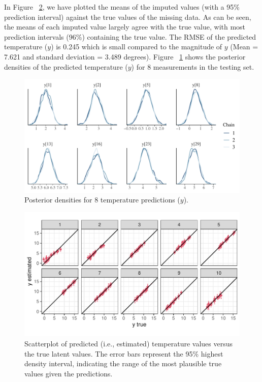 In Figure ~\ref{figure:4y_true_vs_pred}, we have plotted the means of the imputed values (with a 95\% prediction interval) against the true values of the missing data.  As can be seen, the means of each imputed value largely agree with the true value, with most prediction intervals (96\%) containing the true value.
The RMSE of the predicted temperature ($y$) is 0.245 which is small compared to the magnitude of $y$ (Mean = 7.621 and standard deviation = 3.489 degrees). 
Figure ~\ref{figure:3densities_y} shows the posterior densities of the predicted temperature ($y$) for 8 measurements in the testing set.  


\begin{figure}[htbp]
  \centering
   \includegraphics[width=5.0in]{./Figs/3densities_y.pdf}
  \caption{Posterior densities for 8 temperature predictions ($y$). }
  \label{figure:3densities_y}
\end{figure}

\begin{figure}[htbp]
  \centering
   \includegraphics[width=5.0in]{./Figs/4y_true_vs_pred.pdf}
  \caption{
  Scatterplot of predicted (i.e., estimated) temperature values versus the true latent values.
The error bars represent the 95\% highest density interval, indicating the range of the most plausible true values given the predictions.
  }
  \label{figure:4y_true_vs_pred}
\end{figure}


